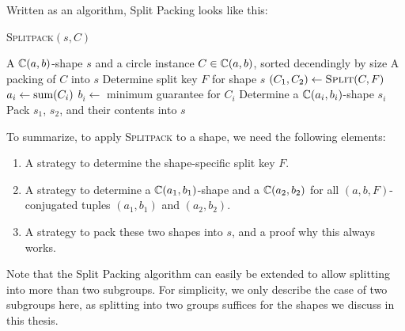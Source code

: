 \documentclass[a4paper,style=print,oneside,bibliography=totoc,nexus,lnum,extramargin]{tubsbook}
\begin{document}

Written as an algorithm, Split Packing looks like this:

\begin{algorithm}
    \caption{\textsc{Splitpack}$(s,C)$}
    \begin{algorithmic}
        \Require A $\mathbb{C}(a,b)$-shape $s$ and a circle instance $C \in \mathbb{C}(a,b)$, sorted decendingly by size
        \Ensure A packing of $C$ into $s$
        \State Determine split key $F$ for shape $s$
        \State $(C_1, C_2) \gets \textsc{Split}(C,F)$ 
            \State $a_i \gets \operatorname{sum}(C_i)$
            \State $b_i \gets$ minimum guarantee for $C_i$ 
            \State Determine a $\mathbb{C}(a_i, b_i)$-shape $s_i$
            \State {}
        \EndFor
        \State Pack $s_1$, $s_2$, and their contents into $s$
    \end{algorithmic}
\end{algorithm}

To summarize, to apply \textsc{Splitpack} to a shape, we need the following elements:

\begin{enumerate}
    \item A strategy to determine the shape-specific split key $F$.
    \item A strategy to determine a $\mathbb{C}(a_1, b_1)$-shape and a $\mathbb{C}(a_2, b_2)$ for all $(a,b,F)$-conjugated tuples $(a_1, b_1)$ and $(a_2, b_2)$.
    \item A strategy to pack these two shapes into $s$, and a proof why this always works.
\end{enumerate}

Note that the Split Packing algorithm can easily be extended to allow splitting into more than two subgroups. For simplicity, we only describe the case of two subgroups here, as splitting into two groups suffices for the shapes we discuss in this thesis.


\end{document}
